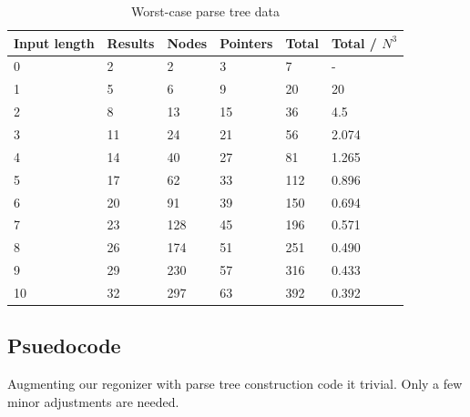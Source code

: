 \documentclass[a4paper,10pt]{article}
\begin{document}
\begin{table}[H]
\centering
\begin{tabular}{ | p{6em} | p{4em} | p{4em} | p{4em} | p{3em} | p{5em} | }
  \hline
  Input length & Results & Nodes & Pointers & Total & Total / $N^{3}$ \\
  \hline
  0 & 2 & 2 & 3 & 7 & - \\
  1 & 5 & 6 & 9 & 20 & 20 \\
  2 & 8 & 13 & 15 & 36 & 4.5 \\
  3 & 11 & 24 & 21 & 56 & 2.074 \\
  4 & 14 & 40 & 27 & 81 & 1.265 \\
  5 & 17 & 62 & 33 & 112 & 0.896 \\
  6 & 20 & 91 & 39 & 150 & 0.694 \\
  7 & 23 & 128 & 45 & 196 & 0.571 \\
  8 & 26 & 174 & 51 & 251 & 0.490 \\
  9 & 29 & 230 & 57 & 316 & 0.433 \\
  10 & 32 & 297 & 63 & 392 & 0.392 \\
  \hline
\end{tabular}
\caption{Worst-case parse tree data}
\end{table}

\subsection{Psuedocode}

Augmenting our regonizer with parse tree construction code it trivial. Only a few minor adjustments are needed.
\end{document}
